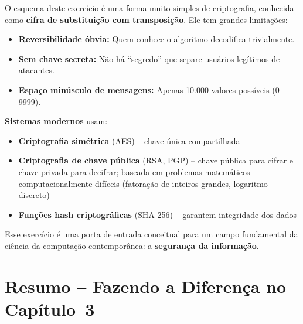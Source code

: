 \documentclass[12pt,a4paper]{article}
\begin{document}
\begin{tcolorbox}[colback=ecolightgreen,colframe=ecogreen,
  title={\bfseries Da brincadeira didática à criptografia real}]

O esquema deste exercício é uma forma muito simples de criptografia, conhecida como
\textbf{cifra de substituição com transposição}. Ele tem grandes limitações:

\begin{itemize}[noitemsep]
  \item \textbf{Reversibilidade óbvia:} Quem conhece o algoritmo decodifica trivialmente.
  \item \textbf{Sem chave secreta:} Não há ``segredo'' que separe usuários legítimos
  de atacantes.
  \item \textbf{Espaço minúsculo de mensagens:} Apenas 10.000 valores possíveis (0--9999).
\end{itemize}

\textbf{Sistemas modernos} usam:
\begin{itemize}[noitemsep]
  \item \textbf{Criptografia simétrica} (AES) -- chave única compartilhada
  \item \textbf{Criptografia de chave pública} (RSA, PGP) -- chave pública para
  cifrar e chave privada para decifrar; baseada em problemas matemáticos
  computacionalmente difíceis (fatoração de inteiros grandes, logaritmo discreto)
  \item \textbf{Funções hash criptográficas} (SHA-256) -- garantem integridade dos dados
\end{itemize}

Esse exercício é uma porta de entrada conceitual para um campo fundamental da
ciência da computação contemporânea: a \textbf{segurança da informação}.
\end{tcolorbox}

\newpage

\section*{Resumo -- Fazendo a Diferença no Capítulo~3}
\end{document}
